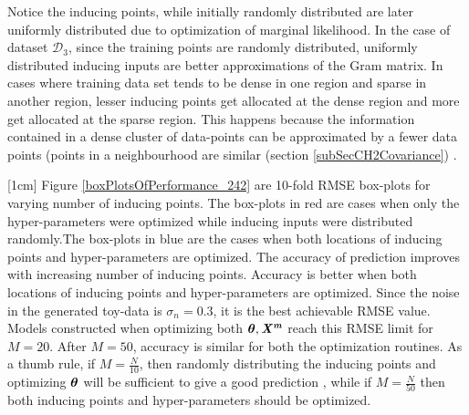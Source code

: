 Notice the inducing points, while initially randomly distributed are later uniformly distributed due to optimization of marginal likelihood. In the case of dataset $\mathcal{D}_3$, since the training points are randomly distributed, uniformly distributed inducing inputs are better approximations of the Gram matrix. In cases where training data set tends to be dense in one region and sparse in another region, lesser inducing points get allocated at the dense region and more get allocated at the sparse region. This happens because the information contained in a dense cluster of data-points can be approximated by a fewer data points (points in a neighbourhood are similar (section \ref{subSecCH2Covariance}) \cite{Snelson06sparsegaussian}.

[1cm]
Figure \ref{boxPlotsOfPerformance_242} are 10-fold RMSE box-plots for varying number of inducing points. The box-plots in red are cases when only the hyper-parameters were optimized while inducing inputs were distributed randomly.The box-plots in blue are the cases when both locations of inducing points and hyper-parameters are optimized. The accuracy of prediction improves with increasing number of inducing points. Accuracy is better when both locations of inducing points and hyper-parameters are optimized. Since the noise in the generated toy-data is $\sigma_{n}=0.3$, it is the best achievable RMSE value. Models constructed when optimizing both $\boldsymbol{\theta}, \bm{\mathit{X^{m}}}$ reach this RMSE limit for $M = 20$. After $M=50$, accuracy is similar for both the optimization routines. As a thumb rule, if $M = \frac{N}{10}$, then randomly distributing the inducing points and optimizing $\boldsymbol{\theta}$ will be sufficient to give a good prediction \cite{cao2013efficient}, while if $M = \frac{N}{50}$ then both inducing points and hyper-parameters should be optimized. 

